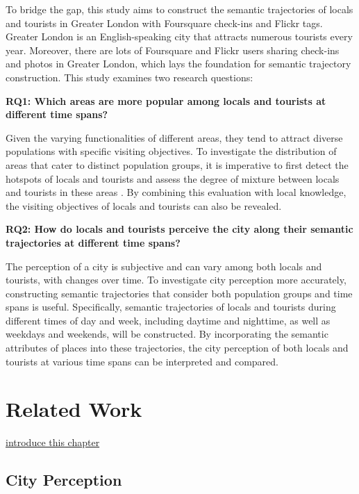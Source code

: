 \documentclass{article}
\theoremstyle{remark}
\begin{document}
To bridge the gap, this study aims to construct the semantic trajectories of locals and tourists in Greater London with Foursquare check-ins and Flickr tags. Greater London is an English-speaking city that attracts numerous tourists every year. Moreover, there are lots of Foursquare and Flickr users sharing check-ins and photos in Greater London, which lays the foundation for semantic trajectory construction. This study examines two research questions:

\textbf{RQ1: Which areas are more popular among locals and tourists at different time spans?}

Given the varying functionalities of different areas, they tend to attract diverse populations with specific visiting objectives. To investigate the distribution of areas that cater to distinct population groups, it is imperative to first detect the hotspots of locals and tourists and assess the degree of mixture between locals and tourists in these areas \citep{li_analyzing_2018}. By combining this evaluation with local knowledge, the visiting objectives of locals and tourists can also be revealed.

\textbf{RQ2: How do locals and tourists perceive the city along their semantic trajectories at different time spans?}

The perception of a city is subjective and can vary among both locals and tourists, with changes over time. To investigate city perception more accurately, constructing semantic trajectories that consider both population groups and time spans is useful. Specifically, semantic trajectories of locals and tourists during different times of day and week, including daytime and nighttime, as well as weekdays and weekends, will be constructed. By incorporating the semantic attributes of places into these trajectories, the city perception of both locals and tourists at various time spans can be interpreted and compared.

\clearpage

\section{Related Work}
\underline{introduce this chapter}

\subsection{City Perception}
\end{document}
